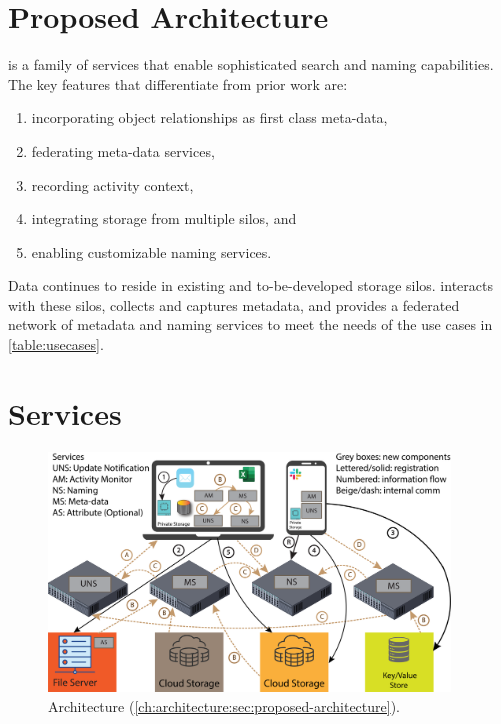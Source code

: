 \section{Proposed Architecture}
\label{ch:architecture:sec:proposed-architecture}

\system is a family of services that enable sophisticated search and naming capabilities.
The key features that differentiate \system from prior work are:

\begin{enumerate}
    \item incorporating object relationships as first class meta-data,
    \item federating meta-data services,
    \item recording activity context,
    \item integrating storage from multiple silos, and
    \item enabling customizable naming services.
\end{enumerate}

Data continues to reside in existing and to-be-developed storage silos.
\system interacts with these silos, collects and captures metadata, and
provides a federated network of metadata and naming services to
meet the needs of the use cases in \autoref{table:usecases}.

\section{\system Services}

\begin{figure}[!tb]
    \centering
    \includegraphics[width=0.95\textwidth]{reference/hotstorage21/figures/Naming5-legend.png}
    \caption{\system Architecture (\autoref{ch:architecture:sec:proposed-architecture}).
    }
    \label{fig:arch}
\end{figure}

